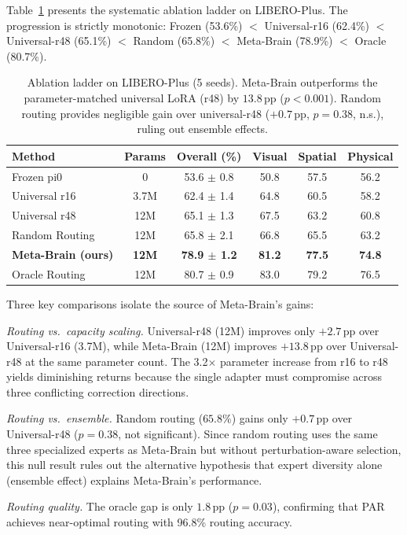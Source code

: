 \documentclass[10pt,twocolumn]{article}
\newcommand{\ours}{Meta-Brain}
\newcommand{\liplus}{LIBERO-Plus}
\newcommand{\pp}{\,\text{pp}}
\begin{document}
Table~\ref{tab:ablation_ladder} presents the systematic ablation ladder on \liplus{}.
The progression is strictly monotonic: Frozen (53.6\%) $<$ Universal-r16 (62.4\%) $<$ Universal-r48 (65.1\%) $<$ Random (65.8\%) $<$ \ours{} (78.9\%) $<$ Oracle (80.7\%).

\begin{table}[t]
\centering
\caption{Ablation ladder on \liplus{} (5 seeds). \ours{} outperforms the parameter-matched universal LoRA (r48) by $13.8\pp$ ($p{<}0.001$). Random routing provides negligible gain over universal-r48 ($+0.7\pp$, $p{=}0.38$, n.s.), ruling out ensemble effects.}
\label{tab:ablation_ladder}
\small
\begin{tabular}{@{}lccccc@{}}
\toprule
Method & Params & Overall (\%) & Visual & Spatial & Physical \\
\midrule
Frozen pi0 & 0 & 53.6 $\pm$ 0.8 & 50.8 & 57.5 & 56.2 \\
Universal r16 & 3.7M & 62.4 $\pm$ 1.4 & 64.8 & 60.5 & 58.2 \\
Universal r48 & 12M & 65.1 $\pm$ 1.3 & 67.5 & 63.2 & 60.8 \\
Random Routing & 12M & 65.8 $\pm$ 2.1 & 66.8 & 65.5 & 63.2 \\
\textbf{\ours{} (ours)} & \textbf{12M} & \textbf{78.9 $\pm$ 1.2} & \textbf{81.2} & \textbf{77.5} & \textbf{74.8} \\
Oracle Routing & 12M & 80.7 $\pm$ 0.9 & 83.0 & 79.2 & 76.5 \\
\bottomrule
\end{tabular}
\end{table}

Three key comparisons isolate the source of \ours{}'s gains:

\textit{Routing vs.\ capacity scaling.}
Universal-r48 (12M) improves only $+2.7\pp$ over Universal-r16 (3.7M), while \ours{} (12M) improves $+13.8\pp$ over Universal-r48 at the same parameter count.
The 3.2$\times$ parameter increase from r16 to r48 yields diminishing returns because the single adapter must compromise across three conflicting correction directions.

\textit{Routing vs.\ ensemble.}
Random routing ($65.8\%$) gains only $+0.7\pp$ over Universal-r48 ($p{=}0.38$, not significant).
Since random routing uses the same three specialized experts as \ours{} but without perturbation-aware selection, this null result rules out the alternative hypothesis that expert diversity alone (ensemble effect) explains \ours{}'s performance.

\textit{Routing quality.}
The oracle gap is only $1.8\pp$ ($p{=}0.03$), confirming that PAR achieves near-optimal routing with 96.8\% routing accuracy.
\end{document}
